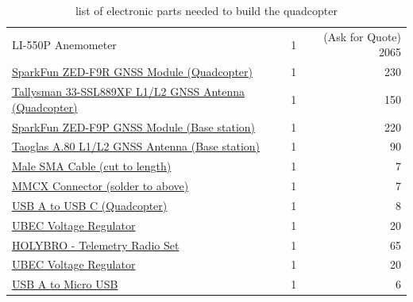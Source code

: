 \documentclass{report}
\begin{document}
\begin{table}[H]
\begin{tabular}{lcr}
{    LI-550P Anemometer} & 1 & (Ask for Quote) 2065 \\
    \href{https://www.sparkfun.com/products/22660}{SparkFun ZED-F9R GNSS Module
    (Quadcopter)} & 1 & 230 \\
    \href{https://www.mouser.co.uk/ProductDetail/Tallysman/33-SSL889XF-1?qs=HoCaDK9Nz5f3zWqM%252BoQQ1w%3D%3D}{Tallysman
    33-SSL889XF L1/L2 GNSS Antenna (Quadcopter)} & 1 & 150 \\
    \href{https://www.sparkfun.com/products/16481}{SparkFun ZED-F9P GNSS Module
    (Base station)} & 1 & 220 \\
    \href{https://www.mouser.co.uk/ProductDetail/Taoglas/A.80.A.101111?qs=MLItCLRbWsw%252BmeY2bOy8tQ%3D%3D}{Taoglas
    A.80 L1/L2 GNSS Antenna (Base station)} & 1 & 90 \\
    \href{https://uk.rs-online.com/web/p/coaxial-cable/2800560}{Male SMA Cable
    (cut to length)} & 1 & 7 \\
    \href{https://uk.rs-online.com/web/p/coaxial-connectors/6559952}{MMCX
    Connector (solder to above)} & 1 & 7 \\
    \href{https://www.amazon.co.uk/Maxhood-Plated-Degree-Converter-Adapter/dp/B077944ZWN?th=1}{USB
    A to USB C (Quadcopter)} & 1 & 8 \\
    \href{https://www.3dxr.co.uk/electronics-c78/power-management-c91/voltage-regulators-becs-c101/matek-systems-matek-ubec-duo-4a-5-12v-4a-5v-p2900}{UBEC
    Voltage Regulator} & 1 & 20 \\
    \href{https://www.3dxr.co.uk/radio-gear-c33/telemetry-c31/433-mhz-telemetry-c32/holybro-sik-telemetry-radio-set-v3-100mw-433mhz-p3021}{HOLYBRO
    - Telemetry Radio Set} & 1 & 65 \\
    \href{https://www.3dxr.co.uk/electronics-c78/power-management-c91/voltage-regulators-becs-c101/matek-systems-matek-ubec-duo-4a-5-12v-4a-5v-p2900}{UBEC
    Voltage Regulator} & 1 & 20 \\
    \href{https://www.amazon.co.uk/Bolongking-Plated-Angle-angled-Charge/dp/B07KTXJ28G/ref=asc_df_B07KTXJ28G/?tag=googshopuk-21&linkCode=df0&hvadid=326462779181&hvpos=&hvnetw=g&hvrand=3720108917475740690&hvpone=&hvptwo=&hvqmt=&hvdev=c&hvdvcmdl=&hvlocint=&hvlocphy=1006886&hvtargid=pla-657947583815&psc=1}{USB
    A to Micro USB} & 1 & 6 \\
    \bottomrule
  \end{tabular}
  \caption{list of electronic parts needed to build the quadcopter}
\end{table}
\end{document}
